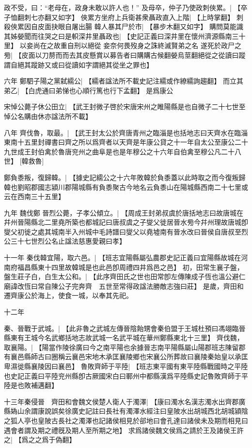 政不受，曰：“老母在，政身未敢以許人也！”
及母卒，仲子乃使政刺俠累。|{
	【卒子恤翻刺七亦翻又如字】}
俠累方坐府上兵衛甚衆聶政直入上階|{
	【上時掌翻】}
刺殺俠累因自皮面抉眼自屠出腸
韓人暴其尸於市|{
	【暴步木翻又如字】}
購問莫能識
其姊嫈聞而往哭之曰是軹深井里聶政也|{
	【史記正義曰深井里在懷州濟源縣南三十里】}
以妾尚在之故重自刑以絕從
妾奈何畏歿身之誅終滅賢弟之名
遂死於政尸之㫄|{
	【皮面以刀剺而而去其皮懸賞以募告者曰購購古候翻嫈烏莖翻絕從之從讀曰蹤謂自絕其蹤跡又或曰從讀如字謂絕其從坐之罪也】
	}
\par 六年
鄭駟子陽之黨弑繻公|{
	【繻者諡法所不載史記注繻或作繚繻詢趨翻】}
而立其弟乙|{
	【白虎通曰弟悌也心順行篤也行下孟翻】}
是爲康公

宋悼公薨子休公田立|{
	【武王封微子啓於宋唐宋州之睢陽縣是也自微子二十七世至悼公名購由休亦諡法所不載】}
\par 八年
齊伐魯，取最。|{
	【武王封太公於齊唐青州之臨淄是也括地志曰天齊水在臨淄東南十五里封禪書曰齊之所以爲齊者以天齊是年康公貸之十一年自太公至康公二十九世成王封伯禽於魯唐兖州之曲阜是也是年穆公之十六年自伯禽至穆公凡二十八世】
	}
[韓救魯]

鄭負黍叛，復歸韓。|{
	【據史記繻公之十六年敗韓於負黍蓋以此時取之而今復叛歸韓也劉昭郡國志潁川郡陽城縣有負黍聚古今地名云負黍山在陽城縣西南二十七里或云在西南三十五里】}
\par 九年
魏伐鄭
晉烈公薨，子孝公傾立。|{
	【周成王封弟叔虞於唐括地志曰故唐城在幷州晉陽縣北二里堯所築也都城記曰唐叔虞之子燮父徙居晉水㫄今幷州理故唐城卽燮父初徙之處其城南半入州城中毛詩譜曰燮父以堯墟南有晉水改曰晉侯自唐叔至烈公三十七世烈公名止諡法慈惠愛親曰孝】}
\par 十一年
秦伐韓宜陽，取六邑。|{
	【班志宜陽縣屬弘農郡史記正義曰宜陽縣故城在河南府福昌縣東十四里故韓城是也此邑卽周禮四井爲邑之邑】}
初，田常生襄子盤，盤生莊子白，白生太公和。|{
	【此序齊田氏之世也田常卽左傳陳成子恆也溫公避仁廟諱改恆曰常自陳公子完奔齊　五世至常得政諡法勝敵志強曰莊】}
是歲，齊田和遷齊康公於海上，使食一城，以奉其先祀。
\par 十二年

秦、晉戰于武城。|{
	【此非魯之武城左傳晉陰飴甥會秦伯盟于王城杜預曰馮翊臨晉縣東有王城今名武鄉括地志故武城一名武平城在華州鄭縣東北十三里】}
齊伐魏，取襄陽。|{
	【陽當作陵徐廣曰今之南平陽也余據晉志南平陽縣屬山陽郡班志陳留郡有襄邑縣師古曰圈稱云襄邑宋地木承匡襄陵鄉也宋襄公所葬故曰襄陵秦始皇以承匡卑濕徙縣襄陵因曰襄邑】}
魯敗齊師于平陸|{
	【班志東平國有東平陸縣戰國時之平陸也史記正義曰平陸兖州縣卽古厥國宋白曰鄆州中都縣漢爲平陸縣史記魯敗齊師于平陸是也敗補邁翻】}
\par
十三年秦侵晉　齊田和會魏文侯楚人衛人于濁澤|{
	【康曰濁水名漢志濁水出齊郡廣縣媯山余謂康說誤矣徐廣史記註曰長社有濁澤水經注曰皇陂水出胡城西北胡城潁陰之狐人亭也皇陂古長社之濁澤也記諸侯相見於郤地曰會孔達曰諸侯未及期而相見曰遇會者謂及期之禮旣及期人至所期之地】}
求爲諸侯魏文侯爲之請於王及諸侯王許之|{
	【爲之之爲于偽翻】}


